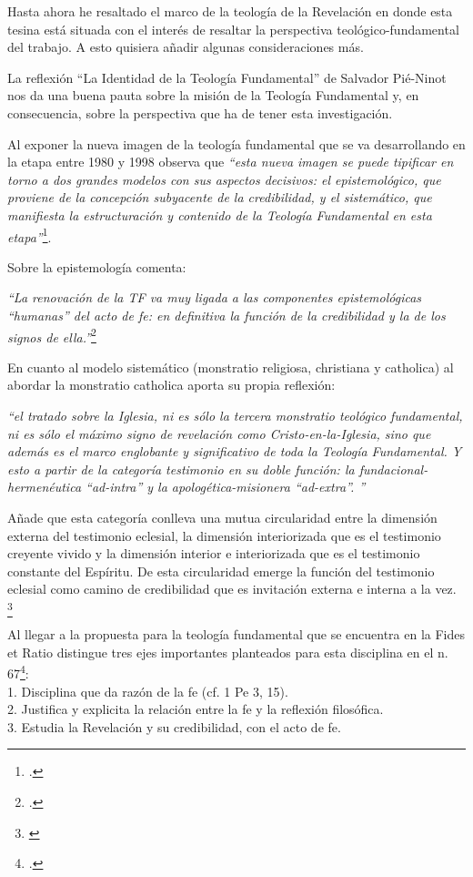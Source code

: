 \documentclass[11pt]{article}
\begin{document}
Hasta ahora he resaltado el marco de la teología de la Revelación en donde esta tesina está situada con el interés de resaltar la perspectiva teológico-fundamental del trabajo. A esto quisiera añadir algunas consideraciones más.

La reflexión ``La Identidad de la Teología Fundamental'' de Salvador Pié-Ninot nos da una buena pauta sobre la misión de la Teología Fundamental y, en consecuencia, sobre la perspectiva que ha de tener esta investigación. 

Al exponer la nueva imagen de la teología fundamental que se va desarrollando en la etapa entre 1980 y 1998 observa que \emph{``esta nueva imagen se puede tipificar en torno a dos grandes modelos con sus aspectos decisivos: el epistemológico, que proviene de la concepción subyacente de la credibilidad, y el sistemático, que manifiesta la estructuración y contenido de la Teología Fundamental en esta etapa''}\footcite[29]{ninotTF}.

Sobre la epistemología comenta:

\emph{
``La renovación de la TF va muy ligada a las componentes epistemológicas ``humanas'' del acto de fe: en definitiva la función de la credibilidad y la de los signos de ella.''}\footcite[31]{ninotTF}

En cuanto al modelo sistemático (monstratio religiosa, christiana y catholica) al abordar la monstratio catholica aporta su propia reflexión:

\emph{
``el tratado sobre la Iglesia, ni es sólo la tercera monstratio teológico fundamental, ni es sólo el máximo signo de revelación como Cristo-en-la-Iglesia, sino que además es el marco englobante y significativo de toda la Teología Fundamental. Y esto a partir de la categoría testimonio en su doble función: la fundacional-hermenéutica ``ad-intra'' y la apologética-misionera ``ad-extra''. ''}

Añade que esta categoría conlleva una mutua circularidad entre la dimensión externa del testimonio eclesial, la dimensión interiorizada que es el testimonio creyente vivido y la dimensión interior e interiorizada que es el testimonio constante del Espíritu. De esta circularidad emerge la función del testimonio eclesial como camino de credibilidad que es invitación externa e interna a la vez. \footnote{\cite[40]{ninotTF}}

Al llegar a la propuesta para la teología fundamental que se encuentra en la Fides et Ratio distingue tres ejes importantes planteados para esta disciplina en el n. 67\footcite[49]{ninotTF}:\\1. Disciplina que da razón de la fe (cf. 1 Pe 3, 15).\\
2. Justifica y explicita la relación entre la fe y la reflexión filosófica.\\
3. Estudia la Revelación y su credibilidad, con el acto de fe.
\end{document}
